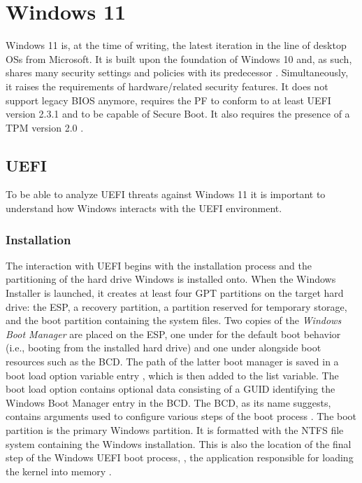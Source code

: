 

\chapter{Windows 11}
\label{sec:windows}

Windows 11 is, at the time of writing, the latest iteration in the line of desktop \acp{OS} from Microsoft.
It is built upon the foundation of Windows 10 and, as such, shares many security settings and policies with its predecessor \cite{microsoft-windows-11-overview}.
Simultaneously, it raises the requirements of hardware\-/related security features.
It does not support legacy \ac{BIOS} anymore, requires the \ac{PF} to conform to at least \ac{UEFI} version 2.3.1 and to be capable of Secure Boot.
It also requires the presence of a \ac{TPM} version 2.0 \cite{microsoft-windows-minimum-hardware-requirements-overview}.

\section{\acs{UEFI}}

To be able to analyze \ac{UEFI} threats against Windows 11 it is important to understand how Windows interacts with the \ac{UEFI} environment.

\subsection{Installation}

The interaction with \ac{UEFI} begins with the installation process and the partitioning of the hard drive Windows is installed onto.
When the Windows Installer is launched, it creates at least four \ac{GPT} partitions on the target hard drive: the \acf{ESP}, a recovery partition, a partition reserved for temporary storage, and the boot partition containing the system files.
Two copies of the \emph{Windows Boot Manager}  are placed on the \ac{ESP}, one under  for the default boot behavior (i.e., booting from the installed hard drive) and one under  alongside boot resources such as the \ac{BCD}.
The path of the latter boot manager is saved in a boot load option variable entry , which is then added to the  list variable.
The boot load option contains optional data consisting of a \ac{GUID} identifying the Windows Boot Manager entry in the \ac{BCD}.
The \ac{BCD}, as its name suggests, contains arguments used to configure various steps of the boot process \cite[Section 12]{windows-internals-7-part2}.
The boot partition is the primary Windows partition.
It is formatted with the \ac{NTFS} file system containing the Windows installation.
This is also the location of the final step of the Windows \ac{UEFI} boot process, , the application responsible for loading the kernel into memory \cite[12. The Windows OS Loader]{windows-internals-7-part2}.

